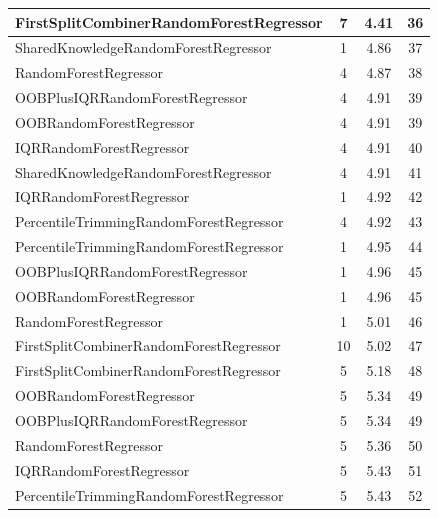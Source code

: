 \begin{table}[h]
\centering
\begin{tabular}{|l|c|c|c|}
\hline
\textcolor[HTML]{ea5545}{FirstSplitCombinerRandomForestRegressor} & 7 & 4.41 & 36 \\ \hline
\textcolor[HTML]{ef9b20}{SharedKnowledgeRandomForestRegressor} & 1 & 4.86 & 37 \\ \hline
\textcolor[HTML]{87bc45}{RandomForestRegressor} & 4 & 4.87 & 38 \\ \hline
\textcolor[HTML]{ede15b}{OOBPlusIQRRandomForestRegressor} & 4 & 4.91 & 39 \\ \hline
\textcolor[HTML]{b33dc6}{OOBRandomForestRegressor} & 4 & 4.91 & 39 \\ \hline
\textcolor[HTML]{27aeef}{IQRRandomForestRegressor} & 4 & 4.91 & 40 \\ \hline
\textcolor[HTML]{ef9b20}{SharedKnowledgeRandomForestRegressor} & 4 & 4.91 & 41 \\ \hline
\textcolor[HTML]{27aeef}{IQRRandomForestRegressor} & 1 & 4.92 & 42 \\ \hline
\textcolor[HTML]{f46a9b}{PercentileTrimmingRandomForestRegressor} & 4 & 4.92 & 43 \\ \hline
\textcolor[HTML]{f46a9b}{PercentileTrimmingRandomForestRegressor} & 1 & 4.95 & 44 \\ \hline
\textcolor[HTML]{ede15b}{OOBPlusIQRRandomForestRegressor} & 1 & 4.96 & 45 \\ \hline
\textcolor[HTML]{b33dc6}{OOBRandomForestRegressor} & 1 & 4.96 & 45 \\ \hline
\textcolor[HTML]{87bc45}{RandomForestRegressor} & 1 & 5.01 & 46 \\ \hline
\textcolor[HTML]{ea5545}{FirstSplitCombinerRandomForestRegressor} & 10 & 5.02 & 47 \\ \hline
\textcolor[HTML]{ea5545}{FirstSplitCombinerRandomForestRegressor} & 5 & 5.18 & 48 \\ \hline
\textcolor[HTML]{b33dc6}{OOBRandomForestRegressor} & 5 & 5.34 & 49 \\ \hline
\textcolor[HTML]{ede15b}{OOBPlusIQRRandomForestRegressor} & 5 & 5.34 & 49 \\ \hline
\textcolor[HTML]{87bc45}{RandomForestRegressor} & 5 & 5.36 & 50 \\ \hline
\textcolor[HTML]{27aeef}{IQRRandomForestRegressor} & 5 & 5.43 & 51 \\ \hline
\textcolor[HTML]{f46a9b}{PercentileTrimmingRandomForestRegressor} & 5 & 5.43 & 52 \\ \hline

\end{tabular}
\end{table}
